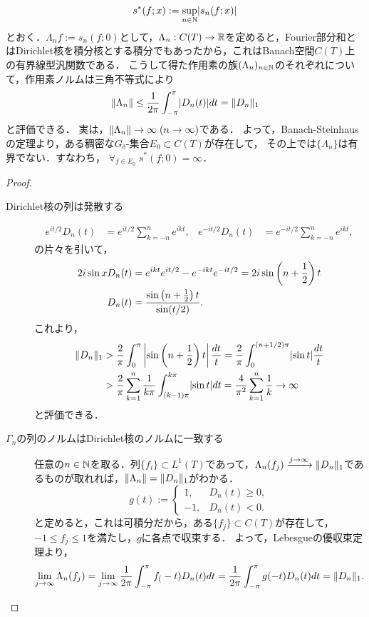 \documentclass[uplatex,dvipdfmx]{jsreport}
\begin{document}
\begin{discussion}
    \[s^*(f;x):=\sup_{n\in\mathbb{N}}\lvert s_n(f;x)\rvert\]
    とおく．$\Lambda_nf:=s_n(f;0)$として，$\Lambda_n:C(T)\to\mathbb{R}$を定めると，Fourier部分和とはDirichlet核を積分核とする積分でもあったから，これはBanach空間$C(T)$上の有界線型汎関数である．
    こうして得た作用素の族$(\Lambda_n)_{n\in\mathbb{N}}$のそれぞれについて，作用素ノルムは三角不等式により
    \[\|\Lambda_n\|\le\frac{1}{2\pi}\int^\pi_{-\pi}\lvert D_n(t)\rvert dt=\|D_n\|_1\]
    と評価できる．
    実は，$\|\Lambda_n\|\to\infty\;(n\to\infty)$である．
    よって，Banach-Steinhausの定理より，ある稠密な$G_\delta$-集合$E_0\subset C(T)$が存在して，
    その上では$\{\Lambda_n\}$は有界でない．すなわち，
    $\forall_{f\in E_0}\;s^*(f;0)=\infty$．
\end{discussion}
\begin{proof}\mbox{}
    \begin{description}
        \item[Dirichlet核の列は発散する] \begin{align*}
            e^{it/2}D_n(t)&=e^{it/2}\sum_{k=-n}^ne^{ikt},&e^{-it/2}D_n(t)&=e^{-it/2}\sum_{k=-n}^ne^{ikt},
        \end{align*}
        の片々を引いて，
        \begin{align*}
            2i\sin xD_n(t)&=e^{ikt}e^{it/2}-e^{-ikt}e^{-it/2}=2i\sin\left(n+\frac{1}{2}\right)t\\
            D_n(t)&=\frac{\sin\left(n+\frac{1}{2}\right)t}{\sin(t/2)}.
        \end{align*}
        これより，
        \begin{align*}
            \|D_n\|_1&>\frac{2}{\pi}\int^\pi_0\left|\sin\left(n+\frac{1}{2}\right)t\right|\frac{dt}{t}=\frac{2}{\pi}\int^{(n+1/2)\pi}_0\lvert\sin t\rvert\frac{dt}{t}\\
            &>\frac{2}{\pi}\sum^n_{k=1}\frac{1}{k\pi}\int^{k\pi}_{(k-1)\pi}\lvert\sin t\rvert dt=\frac{4}{\pi^2}\sum^n_{k=1}\frac{1}{k}\to\infty
        \end{align*}
        と評価できる．
        \item[$\Gamma_n$の列のノルムはDirichlet核のノルムに一致する]
        任意の$n\in\mathbb{N}$を取る．列$\{f_i\}\subset L^1(T)$であって，$\Lambda_n(f_j)\xrightarrow{j\to\infty}\|D_n\|_1$であるものが取れれば，$\|\Lambda_n\|=\|D_n\|_1$がわかる．
        \[g(t):=\begin{cases}
            1,&D_n(t)\ge0,\\
            -1,&D_n(t)<0.
        \end{cases}\]
        と定めると，これは可積分だから，ある$\{f_j\}\subset C(T)$が存在して，$-1\le f_j\le 1$を満たし，$g$に各点で収束する．
        よって，Lebesgueの優収束定理より，
        \[\lim_{j\to\infty}\Lambda_n(f_j)=\lim_{j\to\infty}\frac{1}{2\pi}\int^\pi_{-\pi}f_(-t)D_n(t)dt=\frac{1}{2\pi}\int^\pi_{-\pi}g(-t)D_n(t)dt=\|D_n\|_1.\]
    \end{description}
\end{proof}
\end{document}
